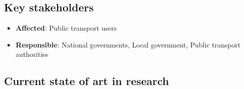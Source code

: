 \documentclass[
]{book}
\providecommand{\tightlist}{%
  \setlength{\itemsep}{0pt}\setlength{\parskip}{0pt}}
\begin{document}
\hypertarget{key-stakeholders-28}{%
\subsection*{Key stakeholders}\label{key-stakeholders-28}}

\begin{itemize}
\tightlist
\item
  \textbf{Affected}: Public transport users
\item
  \textbf{Responsible}: National governments, Local government, Public transport authorities
\end{itemize}

\hypertarget{current-state-of-art-in-research-28}{%
\subsection*{Current state of art in research}\label{current-state-of-art-in-research-28}}
\end{document}
